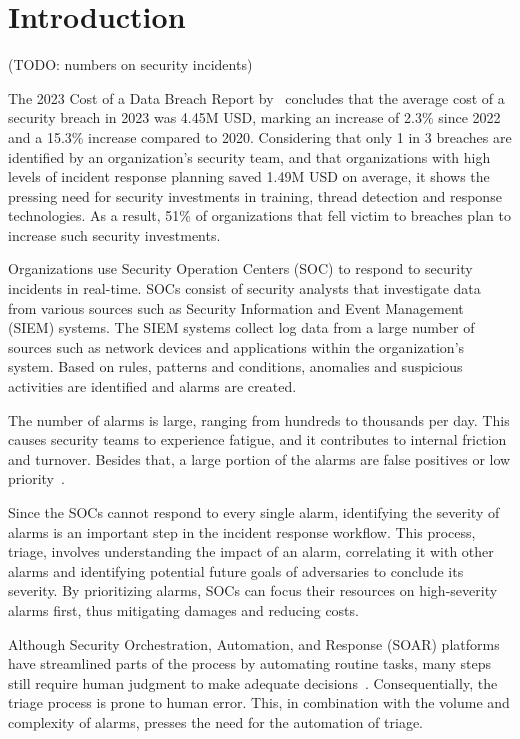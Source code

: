 \section{Introduction}
\label{sec:introduction}

(TODO: numbers on security incidents) %

The 2023 Cost of a Data Breach Report by\ \citet{ibm2023cost} concludes that the average cost of a security breach in
2023 was 4.45M USD, marking an increase of 2.3\% since 2022 and a 15.3\% increase compared to 2020.
Considering that only 1 in 3 breaches are identified by an organization's security team, and that organizations with
high levels of incident response planning saved 1.49M USD on average, it shows the pressing need for security
investments in training, thread detection and response technologies.
As a result, 51\% of organizations that fell victim to breaches plan to increase such security investments.

Organizations use Security Operation Centers (SOC) to respond to security incidents in real-time.
SOCs consist of security analysts that investigate data from various sources such as Security Information and Event
Management (SIEM) systems.
The SIEM systems collect log data from a large number of sources such as network devices and applications within the
organization's system.
Based on rules, patterns and conditions, anomalies and suspicious activities are identified and alarms are created.

The number of alarms is large, ranging from hundreds to thousands per day.
This causes security teams to experience fatigue, and it contributes to internal friction and turnover.
Besides that, a large portion of the alarms are false positives or low priority\ \citep{orca2022fatigue}.

Since the SOCs cannot respond to every single alarm, identifying the severity of alarms is an important step in the
incident response workflow.
This process, triage, involves understanding the impact of an alarm, correlating it with other alarms and identifying
potential future goals of adversaries to conclude its severity.
By prioritizing alarms, SOCs can focus their resources on high-severity alarms first, thus mitigating damages and
reducing costs.

Although Security Orchestration, Automation, and Response (SOAR) platforms have streamlined parts of the process by
automating routine tasks, many steps still require human judgment to make adequate
decisions\ \citep{chuvakin2019triaging}.
Consequentially, the triage process is prone to human error.
This, in combination with the volume and complexity of alarms, presses the need for the automation of triage.


